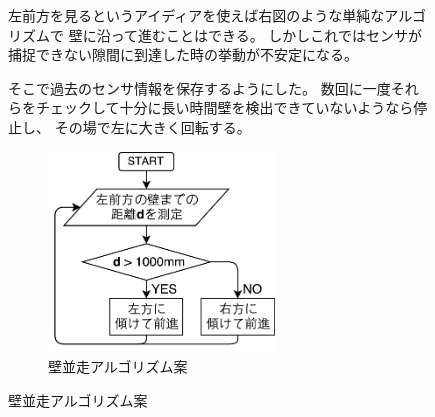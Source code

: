 \documentclass[main]{subfiles}
\begin{document}
\begin{figure}[H]
	\begin{minipage}{0.5\hsize}
		\setlength{\parindent}{1\Cwd}
		左前方を見るというアイディアを使えば右図のような単純なアルゴリズムで
		壁に沿って進むことはできる。
		しかしこれではセンサが捕捉できない隙間に到達した時の挙動が不安定になる。

		そこで過去のセンサ情報を保存するようにした。
		数回に一度それらをチェックして十分に長い時間壁を検出できていないようなら停止し、
		その場で左に大きく回転する。
	\end{minipage}
	\begin{minipage}{0.5\hsize}
		\centering
		\begin{figure}[H]
			\centering
			\includegraphics[width=6cm]{img/wall_01.pdf}
			\caption{壁並走アルゴリズム案}
		\end{figure}
	\end{minipage}
\end{figure}
\end{document}
